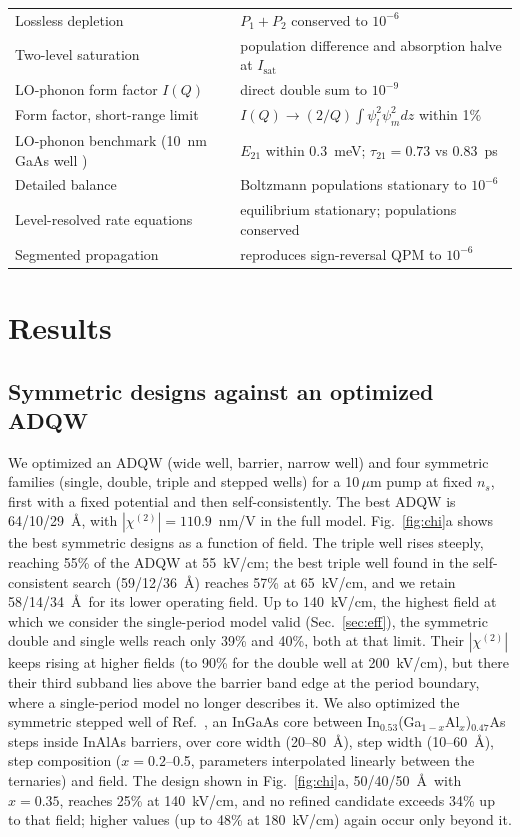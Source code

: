 \documentclass[11pt]{article}
\newcommand{\chitwo}{\chi^{(2)}}
\newcommand{\um}{\,\mu\mathrm{m}}
\begin{document}
\begin{table}[t]
\begin{tabular}{@{}ll@{}}
Lossless depletion & $P_1+P_2$ conserved to $10^{-6}$ \\
Two-level saturation & population difference and absorption halve at $I_\mathrm{sat}$ \\
LO-phonon form factor $I(Q)$ & direct double sum to $10^{-9}$ \\
Form factor, short-range limit & $I(Q)\to(2/Q)\int\psi_l^2\psi_m^2dz$ within 1\% \\
LO-phonon benchmark (10~nm GaAs well \cite{nextnano}) & $E_{21}$ within 0.3~meV; $\tau_{21}=0.73$ vs 0.83~ps \\
Detailed balance & Boltzmann populations stationary to $10^{-6}$ \\
Level-resolved rate equations & equilibrium stationary; populations conserved \\
Segmented propagation & reproduces sign-reversal QPM to $10^{-6}$ \\ \bottomrule
\end{tabular}
\end{table}

\section{Results}
\subsection{Symmetric designs against an optimized ADQW}
We optimized an ADQW (wide well, barrier, narrow well) and four symmetric families (single, double, triple and stepped wells) for a 10$\um$ pump at fixed $n_s$, first with a fixed potential and then self-consistently. The best ADQW is 64/10/29~\AA, with $|\chitwo|=110.9$~nm/V in the full model. Fig.~\ref{fig:chi}a shows the best symmetric designs as a function of field. The triple well rises steeply, reaching 55\% of the ADQW at 55~kV/cm; the best triple well found in the self-consistent search (59/12/36~\AA) reaches 57\% at 65~kV/cm, and we retain 58/14/34~\AA\ for its lower operating field. Up to 140~kV/cm, the highest field at which we consider the single-period model valid (Sec.~\ref{sec:eff}), the symmetric double and single wells reach only 39\% and 40\%, both at that limit. Their $|\chitwo|$ keeps rising at higher fields (to 90\% for the double well at 200~kV/cm), but there their third subband lies above the barrier band edge at the period boundary, where a single-period model no longer describes it. We also optimized the symmetric stepped well of Ref.~\cite{Patent5289309}, an InGaAs core between In$_{0.53}$(Ga$_{1-x}$Al$_x$)$_{0.47}$As steps inside InAlAs barriers, over core width (20--80~\AA), step width (10--60~\AA), step composition ($x=0.2$--0.5, parameters interpolated linearly between the ternaries) and field. The design shown in Fig.~\ref{fig:chi}a, 50/40/50~\AA\ with $x=0.35$, reaches 25\% at 140~kV/cm, and no refined candidate exceeds 34\% up to that field; higher values (up to 48\% at 180~kV/cm) again occur only beyond it.
\end{document}
